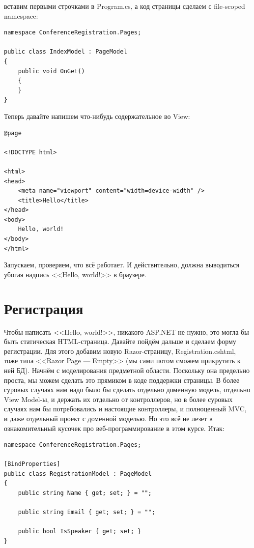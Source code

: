 \documentclass{../../text-style}
\begin{document}
вставим первыми строчками в Program.cs, а код страницы сделаем с file-scoped namespace:

\begin{verbatim}
namespace ConferenceRegistration.Pages;

public class IndexModel : PageModel
{
    public void OnGet()
    {
    }
}
\end{verbatim}

Теперь давайте напишем что-нибудь содержательное во View:

\begin{verbatim}
@page

<!DOCTYPE html>

<html>
<head>
    <meta name="viewport" content="width=device-width" />
    <title>Hello</title>
</head>
<body>
    Hello, world!
</body>
</html>
\end{verbatim}

Запускаем, проверяем, что всё работает. И действительно, должна выводиться убогая надпись <<Hello, world!>> в браузере.

\section{Регистрация}

Чтобы написать <<Hello, world!>>, никакого ASP.NET не нужно, это могла бы быть статическая HTML-страница. Давайте пойдём дальше и сделаем форму регистрации. Для этого добавим новую Razor-страницу, Registration.cshtml, тоже типа <<Razor Page --- Empty>> (мы сами потом сможем прикрутить к ней БД). Начнём с моделирования предметной области. Поскольку она предельно проста, мы можем сделать это прямиком в коде поддержки страницы. В более суровых случаях нам надо было бы сделать отдельно доменную модель, отдельно View Model-ы, и держать их отдельно от контроллеров, но в более суровых случаях нам бы потребовались и настоящие контроллеры, и полноценный MVC, и даже отдельный проект с доменной моделью. Но это всё не лезет в ознакомительный кусочек про веб-программирование в этом курсе. Итак:

\begin{verbatim}
namespace ConferenceRegistration.Pages;

[BindProperties]
public class RegistrationModel : PageModel
{
    public string Name { get; set; } = "";

    public string Email { get; set; } = "";

    public bool IsSpeaker { get; set; }
}
\end{verbatim}
\end{document}
